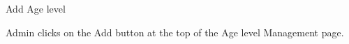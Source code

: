 
\begin{uc}{Add Age level}


    \begin{uc-trig}
        Admin clicks on the Add button at the top of the Age level Management
        page.
    \end{uc-trig}

\end{uc}

